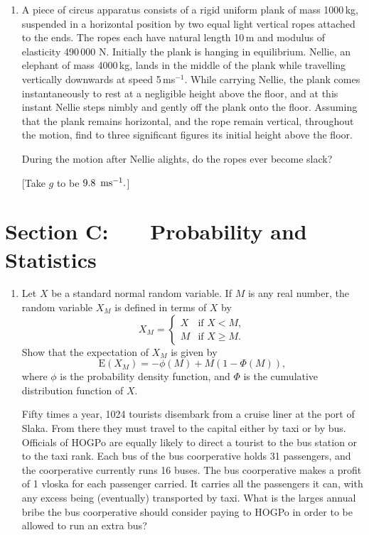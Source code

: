 \documentclass[a4, 11pt]{report}
\newlength{\qspace}
\newcounter{qnumber}
\newenvironment{question}%
 {\vspace{\qspace}
  \begin{enumerate}[\bfseries 1\quad][10]%
    \setcounter{enumi}{\value{qnumber}}%
    \item%
 }
{
  \end{enumerate}
  \filbreak
  \stepcounter{qnumber}
 }
\begin{document}
\begin{question}
A piece of circus apparatus consists of a rigid uniform plank of mass
1000$\,$kg, suspended in a horizontal position by two equal light
vertical ropes attached to the ends. The ropes each have natural length
10$\,$m and modulus of elasticity 490$\,$000 N. Initially the plank
is hanging in equilibrium. Nellie, an elephant of mass 4000$\,$kg,
lands in the middle of the plank while travelling vertically downwards
at speed 5$\,$ms$^{-1}.$ While carrying Nellie, the plank comes
instantaneously to rest at a negligible height above the floor, and
at this instant Nellie steps nimbly and gently off the plank onto
the floor. Assuming that the plank remains horizontal, and the rope
remain vertical, throughout the motion, find to three significant
figures its initial height above the floor. 


During the motion after Nellie alights, do the ropes ever become slack?


{[}Take $g$ to be $9.8\mbox{\,\ ms}^{-1}.${]} 
\end{question}
	
	\newpage
\section*{Section C: \ \ \ Probability and Statistics}


\begin{question}
Let $X$ be a standard normal random variable. If $M$ is any real
number, the random variable $X_{M}$ is defined in terms of $X$ by
\[
X_{M}=\begin{cases}
X & \mbox{if }X<M,\\
M & \mbox{if }X\geqslant M.
\end{cases}
\]
Show that the expectation of $X_{M}$ is given by 
\[
\mathrm{E}(X_{M})=-\phi(M)+M(1-\Phi(M)),
\]
where $\phi$ is the probability density function, and $\Phi$ is
the cumulative distribution function of $X$. 


Fifty times a year, 1024 tourists disembark from a cruise liner at
the port of Slaka. From there they must travel to the capital either
by taxi or by bus. Officials of HOGPo are equally likely to direct
a tourist to the bus station or to the taxi rank. Each bus of the
bus coorperative holds 31 passengers, and the coorperative currently
runs 16 buses. The bus coorperative makes a profit of 1 vloska for
each passenger carried. It carries all the passengers it can, with
any excess being (eventually) transported by taxi. What is the larges
annual bribe the bus coorperative should consider paying to HOGPo
in order to be allowed to run an extra bus?
\end{question}
\end{document}

